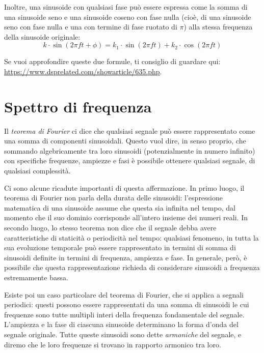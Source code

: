 \documentclass[11pt]{report}
\begin{document}
Inoltre, una sinusoide con qualsiasi fase può essere espressa come la somma di una sinusoide seno e una sinusoide coseno con fase nulla (cioè, di una sinusoide seno con fase nulla e una con termine di fase ruotato di $\pi$) alla stessa frequenza della sinusoide originale:
\begin{equation}
k \cdot \sin(2 \pi f t + \phi) = k_1 \cdot \sin(2 \pi f t) + k_2 \cdot \cos(2 \pi f t)
\end{equation}

Se vuoi approfondire queste due formule, ti consiglio di guardare qui: \url{https://www.dsprelated.com/showarticle/635.php}.




\section{Spettro di frequenza}


Il \emph{teorema di Fourier} ci dice che qualsiasi segnale può essere rappresentato come una somma di componenti sinusoidali. Questo vuol dire, in senso proprio, che sommando algebricamente tra loro sinusoidi (potenzialmente in numero infinito) con specifiche frequenze, ampiezze e fasi è possibile ottenere qualsiasi segnale, di qualsiasi complessità. 

Ci sono alcune ricadute importanti di questa affermazione. In primo luogo, il teorema di Fourier non parla della durata delle sinusoidi: l'espressione matematica di una sinusoide assume che questa sia infinita nel tempo, dal momento che il suo dominio corrisponde all'intero insieme dei numeri reali. In secondo luogo, lo stesso teorema non dice che il segnale debba avere caratteristiche di staticità o periodicità nel tempo: qualsiasi fenomeno, in tutta la sua evoluzione temporale può essere rappresentato in termini di somma di sinusoidi definite in termini di frequenza, ampiezza e fase. In generale, però, è possibile che questa rappresentazione richieda di considerare sinusoidi a frequenza estremamente bassa.

Esiste poi un caso particolare del teorema di Fourier, che si applica a segnali periodici: questi possono essere rappresentati da una somma di sinusoidi le cui frequenze sono tutte multipli interi della frequenza fondamentale del segnale. L'ampiezza e la fase di ciascuna sinusoide determinano la forma d'onda del segnale originale. Tutte queste sinusoidi sono dette \emph{armoniche} del segnale, e diremo che le loro frequenze si trovano in rapporto armonico tra loro.
\end{document}
